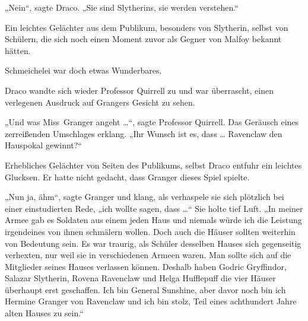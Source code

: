 „Nein“, sagte Draco.
„Sie sind Slytherins, sie werden verstehen.“

Ein leichtes Gelächter aus dem Publikum, besonders von Slytherin, selbst von Schülern, die sich noch einen Moment zuvor als Gegner von Malfoy bekannt hätten.

Schmeichelei war doch etwas Wunderbares.

Draco wandte sich wieder Professor Quirrell zu und war überrascht, einen verlegenen Ausdruck auf Grangers Gesicht zu sehen.

„Und was Miss~Granger angeht …“, sagte Professor Quirrell. Das Geräusch eines zerreißenden Umschlages erklang.
„Ihr Wunsch ist es, dass … Ravenclaw den Hauspokal gewinnt?“

Erhebliches Gelächter von Seiten des Publikums, selbst Draco entfuhr ein leichtes Glucksen. Er hatte nicht gedacht, dass Granger dieses Spiel spielte.

„Nun ja, ähm“, sagte Granger und klang, als verhaspele sie sich plötzlich bei einer einstudierten Rede, „ich wollte sagen, dass …“ Sie holte tief Luft.
„In meiner Armee gab es Soldaten aus einem jeden Haus und niemals würde ich die Leistung irgendeines von ihnen schmälern wollen. Doch auch die Häuser sollten weiterhin von Bedeutung sein. Es war traurig, als Schüler desselben Hauses sich gegenseitig verhexten, nur weil sie in verschiedenen Armeen waren. Man sollte sich auf die Mitglieder seines Hauses verlassen können. Deshalb haben Godric Gryffindor, Salazar Slytherin, Rovena Ravenclaw und Helga Hufflepuff die vier Häuser überhaupt erst geschaffen. Ich bin General Sunshine, aber davor noch bin ich Hermine Granger von Ravenclaw und ich bin stolz, Teil eines achthundert Jahre alten Hauses zu sein.“

